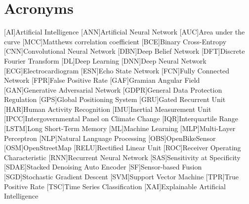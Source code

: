 
\cleardoublepage
\chapter{Acronyms}

\acresetall

\begin{acronym}[Bash]
	[AI]{Artificial Intelligence}
	[ANN]{Artificial Neural Network}
	[AUC]{Area under the curve}
	[MCC]{Matthews correlation coefficient}
	[BCE]{Binary Cross-Entropy}
	[CNN]{Convolutional Neural Network}
	[DBN]{Deep Belief Network}
	[DFT]{Discrete Fourier Transform}
	[DL]{Deep Learning}
	[DNN]{Deep Neural Network}
	[ECG]{Electrocardiogram}
	[ESN]{Echo State Network}
	[FCN]{Fully Connected Network}
	[FPR]{False Positive Rate}
	[GAF]{Gramian Angular Field}
	[GAN]{Generative Adversarial Network}
	[GDPR]{General Data Protection Regulation}
	[GPS]{Global Positioning System}
	[GRU]{Gated Recurrent Unit}
	[HAR]{Human Activity Recognition}
	[IMU]{Inertial Measurement Unit}
	[IPCC]{Intergovernmental Panel on Climate Change}
	[IQR]{Interquartile Range}
	[LSTM]{Long Short-Term Memory}	
	[ML]{Machine Learning}
	[MLP]{Multi-Layer Perceptron}
	[NLP]{Natural Language Processing}
	[OBS]{OpenBikeSensor}
	[OSM]{OpenStreetMap}
	[RELU]{Rectified Linear Unit}
	[ROC]{Receiver Operating Characteristic}
	[RNN]{Recurrent Neural Network}
	[SAS]{Sensitivity at Specificity}
	[SDAE]{Stacked Denoising Auto Encoder}
	[SF]{Sensor-based Fusion}
	[SGD]{Stochastic Gradient Descent}
	[SVM]{Support Vector Machine}
	[TPR]{True Positive Rate}
	[TSC]{Time Series Classification}
	[XAI]{Explainable Artificial Intelligence}
\end{acronym}

\acresetall